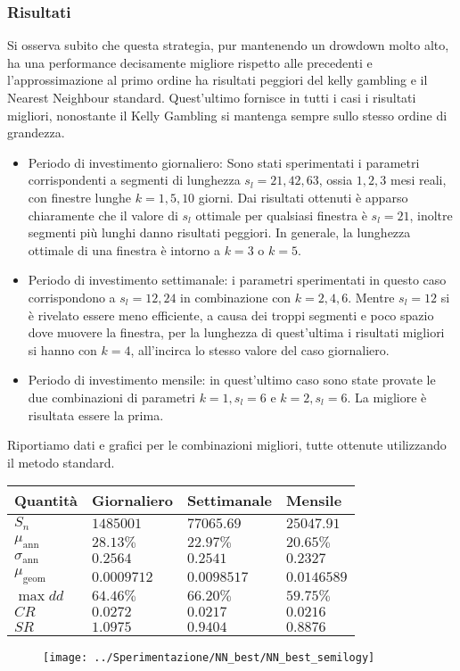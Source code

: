 \documentclass[a4paper,11pt]{book}
\theoremstyle{plain}
\theoremstyle{definition}
\theoremstyle{remark}
\begin{document}
\subsubsection{Risultati}
Si osserva subito che questa strategia, pur mantenendo un drowdown molto alto, ha una performance decisamente migliore rispetto alle precedenti e l'approssimazione al primo ordine ha risultati peggiori del kelly gambling e il Nearest Neighbour standard. Quest'ultimo fornisce in tutti i casi i risultati migliori, nonostante il Kelly Gambling si mantenga sempre sullo stesso ordine di grandezza.
\begin{itemize}
	\item Periodo di investimento giornaliero: Sono stati sperimentati i parametri corrispondenti a segmenti di lunghezza $s_l=21,42,63$, ossia $1,2,3$ mesi reali, con finestre lunghe $k=1,5,10$ giorni. Dai risultati ottenuti è apparso chiaramente che il valore di $s_l$ ottimale per qualsiasi finestra è $s_l=21$, inoltre segmenti più lunghi danno risultati peggiori. In generale, la lunghezza ottimale di una finestra è intorno a $k=3$ o $k=5$.
	\item Periodo di investimento settimanale: i parametri sperimentati in questo caso corrispondono a $s_l = 12,24$ in combinazione con $k = 2,4,6$. Mentre $s_l=12$ si è rivelato essere meno efficiente, a causa dei troppi segmenti e poco spazio dove muovere la finestra, per la lunghezza di quest'ultima i risultati migliori si hanno con $k=4$, all'incirca lo stesso valore del caso giornaliero.
	\item Periodo di investimento mensile: in quest'ultimo caso sono state provate le due combinazioni di parametri $k=1, s_l=6$ e $k=2,s_l=6$. La migliore è risultata essere la prima.
\end{itemize}
Riportiamo dati e grafici per le combinazioni migliori, tutte ottenute utilizzando il metodo standard.
\begin{table}[H]
	\centering
	\begin{tabular}{|l|l|l|l|}
		\hline
		Quantità 			  & Giornaliero	 & Settimanale 	& Mensile		\\\hline
		$S_n$                 & $1485001 $   & $77065.69$	& $25047.91$ 	\\
		$\mu_{\text{ann}}$    & $28.13\%$    & $22.97\%$	& $20.65\%$		\\
		$\sigma_{\text{ann}}$ & $0.2564$     & $0.2541$		& $0.2327$		\\
		$\mu_{\text{geom}}$   & $0.0009712$  & $0.0098517$	& $0.0146589$	\\
		$\max dd$             & $64.46\%$    & $66.20\%$	& $59.75\%$		\\
		$CR$                  & $0.0272$     & $0.0217$		& $0.0216$		\\
		$SR$                  & $1.0975$     & $0.9404$		& $0.8876$		\\\hline
	\end{tabular}
\end{table}
\begin{figure}[H]
	\centering
	\texttt{[image: ../Sperimentazione/NN\_best/NN\_best\_semilogy]}
	\caption{}
	\label{fig:nnbestsemilogy}
\end{figure}
\end{document}
